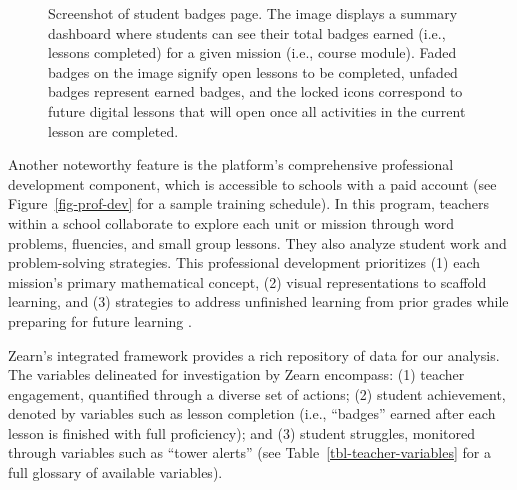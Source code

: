 \documentclass[
  number,
  preprint,
  3p,
  onecolumn]{elsarticle}
\begin{document}
\begin{figure}


\caption{\label{fig-badges-screen}Screenshot of student badges page. The
image displays a summary dashboard where students can see their total
badges earned (i.e., lessons completed) for a given mission (i.e.,
course module). Faded badges on the image signify open lessons to be
completed, unfaded badges represent earned badges, and the locked icons
correspond to future digital lessons that will open once all activities
in the current lesson are completed.}

\end{figure}%

Another noteworthy feature is the platform's comprehensive professional
development component, which is accessible to schools with a paid
account (see Figure~\ref{fig-prof-dev} for a sample training schedule).
In this program, teachers within a school collaborate to explore each
unit or mission through word problems, fluencies, and small group
lessons. They also analyze student work and problem-solving strategies.
This professional development prioritizes (1) each mission's primary
mathematical concept, (2) visual representations to scaffold learning,
and (3) strategies to address unfinished learning from prior grades
while preparing for future learning \citep{morrison2019}.

Zearn's integrated framework provides a rich repository of data for our
analysis. The variables delineated for investigation by Zearn encompass:
(1) teacher engagement, quantified through a diverse set of actions; (2)
student achievement, denoted by variables such as lesson completion
(i.e., ``badges'' earned after each lesson is finished with full
proficiency); and (3) student struggles, monitored through variables
such as ``tower alerts'' (see Table~\ref{tbl-teacher-variables} for a
full glossary of available variables).
\end{document}
